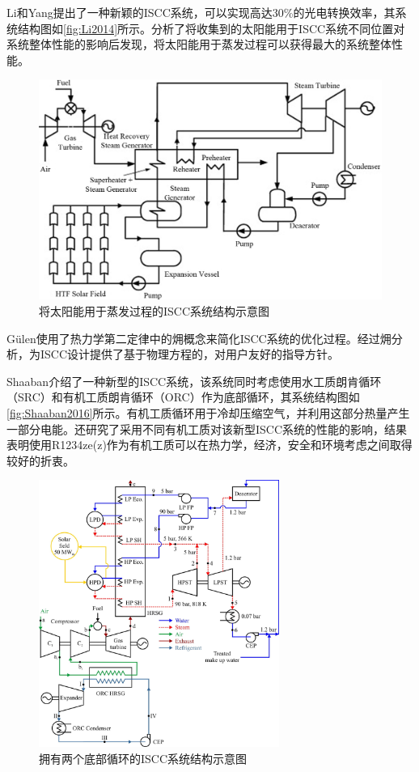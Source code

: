 Li和Yang\cite{Li2014}提出了一种新颖的ISCC系统，可以实现高达30\%的光电转换效率，其系统结构图如\autoref{fig:Li2014}所示。分析了将收集到的太阳能用于ISCC系统不同位置对系统整体性能的影响后发现，将太阳能用于蒸发过程可以获得最大的系统整体性能。
\begin{figure}[!ht]
\centering
\includegraphics[width=.8\textwidth]{fig/Li2014.jpg}
\caption{将太阳能用于蒸发过程的ISCC系统结构示意图}
\label{fig:Li2014}
\end{figure}

G\"{u}len\cite{Gulen2015}使用了热力学第二定律中的㶲概念来简化ISCC系统的优化过程。经过㶲分析，为ISCC设计提供了基于物理方程的，对用户友好的指导方针。


Shaaban\cite{Shaaban2016}介绍了一种新型的ISCC系统，该系统同时考虑使用水工质朗肯循环（SRC）和有机工质朗肯循环（ORC）作为底部循环，其系统结构图如\autoref{fig:Shaaban2016}所示。有机工质循环用于冷却压缩空气，并利用这部分热量产生一部分电能。还研究了采用不同有机工质对该新型ISCC系统的性能的影响，结果表明使用R1234ze(z)作为有机工质可以在热力学，经济，安全和环境考虑之间取得较好的折衷。
\begin{figure}[!ht]
\centering
\includegraphics[width=0.7\textwidth]{fig/Shaaban2016.jpg}
\caption{拥有两个底部循环的ISCC系统结构示意图}\label{fig:Shaaban2016}
\end{figure}

